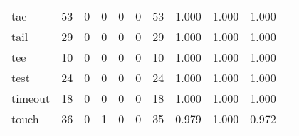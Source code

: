 \begin{longtable}{lp{1.2cm}p{1.2cm}p{1.2cm}p{1.2cm}p{1.2cm}p{1.2cm}p{1.2cm}p{1.2cm}p{1.2cm}p{1.2cm}}
tac       &                                    53 &                                                  0 &                                                  0 &                                                  0 &                                                  0 &                                                 53 &                                              1.000 &                                              1.000 &                                              1.000 \\
tail      &                                    29 &                                                  0 &                                                  0 &                                                  0 &                                                  0 &                                                 29 &                                              1.000 &                                              1.000 &                                              1.000 \\
tee       &                                    10 &                                                  0 &                                                  0 &                                                  0 &                                                  0 &                                                 10 &                                              1.000 &                                              1.000 &                                              1.000 \\
test      &                                    24 &                                                  0 &                                                  0 &                                                  0 &                                                  0 &                                                 24 &                                              1.000 &                                              1.000 &                                              1.000 \\
timeout   &                                    18 &                                                  0 &                                                  0 &                                                  0 &                                                  0 &                                                 18 &                                              1.000 &                                              1.000 &                                              1.000 \\
touch     &                                    36 &                                                  0 &                                                  1 &                                                  0 &                                                  0 &                                                 35 &                                              0.979 &                                              1.000 &                                              0.972 \\

\end{longtable}
